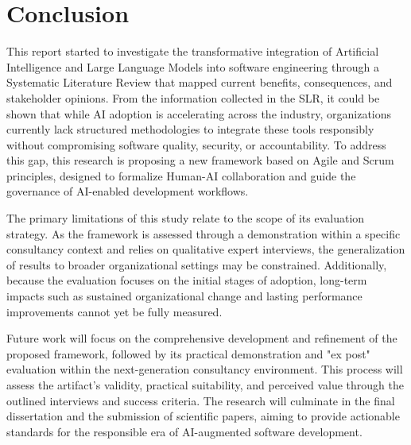 \section{Conclusion}

This report started to investigate the transformative integration of Artificial Intelligence and Large Language Models into software engineering through a Systematic Literature Review that mapped current benefits, consequences, and stakeholder opinions. From the information collected in the SLR, it could be shown that while AI adoption is accelerating across the industry, organizations currently lack structured methodologies to integrate these tools responsibly without compromising software quality, security, or accountability. To address this gap, this research is proposing a new framework based on Agile and Scrum principles, designed to formalize Human-AI collaboration and guide the governance of AI-enabled development workflows.

The primary limitations of this study relate to the scope of its evaluation strategy. As the framework is assessed through a demonstration within a specific consultancy context and relies on qualitative expert interviews, the generalization of results to broader organizational settings may be constrained. Additionally, because the evaluation focuses on the initial stages of adoption, long-term impacts such as sustained organizational change and lasting performance improvements cannot yet be fully measured.

Future work will focus on the comprehensive development and refinement of the proposed framework, followed by its practical demonstration and "ex post" evaluation within the next-generation consultancy environment. This process will assess the artifact’s validity, practical suitability, and perceived value through the outlined interviews and success criteria. The research will culminate in the final dissertation and the submission of scientific papers, aiming to provide actionable standards for the responsible era of AI-augmented software development.

